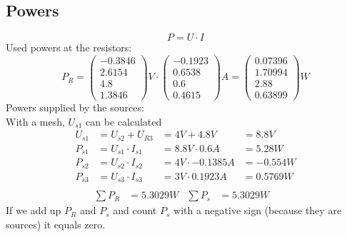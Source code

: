 {\subsection{Powers}
\begin{equation*}
   P = U \cdot I
\end{equation*}
Used powers at the resistors:
\begin{equation*}
   P_R = 
   \begin{pmatrix}
      -0.3846\\ 2.6154\\ 4.8\\ 1.3846
   \end{pmatrix}
   V \cdot
   \begin{pmatrix}
      -0.1923\\ 0.6538\\ 0.6\\ 0.4615
   \end{pmatrix}
   A =
   \begin{pmatrix}
      0.07396\\ 1.70994\\ 2.88\\ 0.63899
   \end{pmatrix}
   W
\end{equation*}
Powers supplied by the sources:\\
With a mesh, $U_{s1}$ can be calculated
\begin{align*}
   U_{s1} &= U_{s2} + U_{R3} &= 4V + 4.8V &= 8.8V\\
   P_{s1} &= U_{s1} \cdot I_{s1} &= 8.8V \cdot 0.6A &= 5.28W\\
   P_{s2} &= U_{s2} \cdot I_{s2} &= 4V \cdot -0.1385A &= -0.554W\\
   P_{s3} &= U_{s3} \cdot I_{s3} &= 3V \cdot 0.1923A &= 0.5769W\\
\end{align*}
\begin{align*}
   \sum P_R &= 5.3029W&
   \sum P_s &= 5.3029W&
\end{align*}
If we add up $P_R$ and $P_s$ and count $P_s$ with a negative sign (because they are sources) it equals zero.

}
